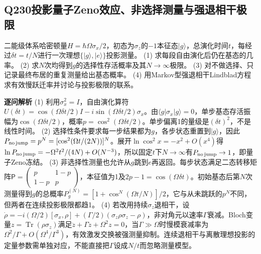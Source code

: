 \subsection*{Q230\quad 投影量子Zeno效应、非选择测量与强退相干极限}
二能级体系哈密顿量$H=\hbar\Omega\sigma_x/2$，初态为$\sigma_z$的$-1$本征态$|g\rangle$，总演化时间$t$，每经过$\delta t=t/N$进行一次理想$\{|g\rangle,|e\rangle\}$投影测量。
(1) 求每段自由演化后仍在基态的几率。
(2) 求$N$次均得到$g$的选择性存活概率及其$N\to\infty$极限。
(3) 对不做选择、只记录最终布居的重复测量给出基态概率。
(4) 用Markov型强退相干Lindblad方程求有效慢跃迁率并讨论与投影极限的联系。
\par\textbf{逐问解析}
(1) 利用$\sigma_x^2=I$，自由演化算符$U(\delta t)=\cos(\Omega\delta t/2)I-i\sin(\Omega\delta t/2)\sigma_x$。由$\langle g|\sigma_x|g\rangle=0$，单步基态存活振幅为$\cos(\Omega\delta t/2)$，概率$p=\cos^2(\Omega\delta t/2)$。单步偏离1的量级是$(\delta t)^2$，不是线性时间。
(2) 选择性条件要求每一步结果都为$g$，各步状态重置到$|g\rangle$，因此$P_{\rm no\,jump}=p^N=[\cos^2(\Omega t/(2N))]^N$。展开$\ln\cos^2x=-x^2+O(x^4)$得$\ln P_{\rm no\,jump}=-\Omega^2t^2/(4N)+O(N^{-3})$，所以固定$t$下$N\to\infty$有$P_{\rm no\,jump}\to1$，即量子Zeno冻结。
(3) 非选择性测量也允许从$g$跳到$e$再返回。每步状态满足二态转移矩阵$\mathsf P=\begin{pmatrix}p&1-p\\1-p&p\end{pmatrix}$，本征值为1及$2p-1=\cos(\Omega\delta t)$。初始基态后第$N$次测量得到$g$的总概率$P_g^{(N)}=[1+\cos^N(\Omega t/N)]/2$，它与从未跳跃的$p^N$不同，但两者在连续投影极限都趋1。
(4) 若改用持续$\sigma_z$退相干，设$\dot\rho=-i(\Omega/2)[\sigma_x,\rho]+(\Gamma/2)(\sigma_z\rho\sigma_z-\rho)$，非对角元以速率$\Gamma$衰减。Bloch变量$z=\operatorname{Tr}(\rho\sigma_z)$满足$\ddot z+\Gamma\dot z+\Omega^2z=0$，当$\Gamma\gg\Omega$时慢模衰减率为$\Omega^2/\Gamma+O(\Omega^4/\Gamma^3)$，有效激发交换被强测量抑制。连续退相干与离散理想投影的定量参数需单独对应，不能直接把$\Gamma$设成$N/t$而忽略测量模型。
\par\medskip
